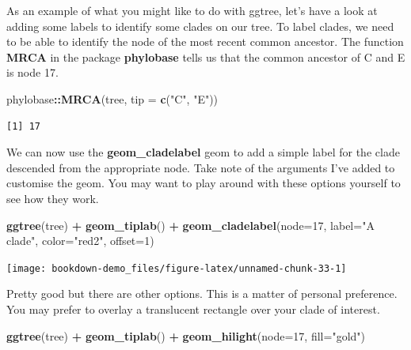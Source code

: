 \documentclass[
]{book}
\newenvironment{Shaded}{\begin{snugshade}}{\end{snugshade}}
\newcommand{\DataTypeTok}[1]{\textcolor[rgb]{0.13,0.29,0.53}{#1}}
\newcommand{\DecValTok}[1]{\textcolor[rgb]{0.00,0.00,0.81}{#1}}
\newcommand{\KeywordTok}[1]{\textcolor[rgb]{0.13,0.29,0.53}{\textbf{#1}}}
\newcommand{\NormalTok}[1]{#1}
\newcommand{\OperatorTok}[1]{\textcolor[rgb]{0.81,0.36,0.00}{\textbf{#1}}}
\newcommand{\StringTok}[1]{\textcolor[rgb]{0.31,0.60,0.02}{#1}}
\begin{document}
As an example of what you might like to do with ggtree, let's have a look at adding some labels to identify some clades on our tree. To label clades, we need to be able to identify the node of the most recent common ancestor. The function \textbf{MRCA} in the package \textbf{phylobase} \citep{phylobase} tells us that the common ancestor of C and E is node 17.

\begin{Shaded}
\begin{Highlighting}[]
\NormalTok{phylobase}\OperatorTok{::}\KeywordTok{MRCA}\NormalTok{(tree, }\DataTypeTok{tip =} \KeywordTok{c}\NormalTok{(}\StringTok{"C"}\NormalTok{, }\StringTok{"E"}\NormalTok{))}
\end{Highlighting}
\end{Shaded}

\begin{verbatim}
[1] 17
\end{verbatim}

We can now use the \textbf{geom\_cladelabel} geom to add a simple label for the clade descended from the appropriate node. Take note of the arguments I've added to customise the geom. You may want to play around with these options yourself to see how they work.

\begin{Shaded}
\begin{Highlighting}[]
\KeywordTok{ggtree}\NormalTok{(tree) }\OperatorTok{+}\StringTok{ }
\StringTok{  }\KeywordTok{geom\_tiplab}\NormalTok{() }\OperatorTok{+}\StringTok{ }
\StringTok{  }\KeywordTok{geom\_cladelabel}\NormalTok{(}\DataTypeTok{node=}\DecValTok{17}\NormalTok{, }\DataTypeTok{label=}\StringTok{"A clade"}\NormalTok{, }
                  \DataTypeTok{color=}\StringTok{"red2"}\NormalTok{, }\DataTypeTok{offset=}\DecValTok{1}\NormalTok{)}
\end{Highlighting}
\end{Shaded}

\begin{center}\texttt{[image: bookdown-demo\_files/figure-latex/unnamed-chunk-33-1]} \end{center}

Pretty good but there are other options. This is a matter of personal preference. You may prefer to overlay a translucent rectangle over your clade of interest.

\begin{Shaded}
\begin{Highlighting}[]
\KeywordTok{ggtree}\NormalTok{(tree) }\OperatorTok{+}\StringTok{ }
\StringTok{  }\KeywordTok{geom\_tiplab}\NormalTok{() }\OperatorTok{+}\StringTok{ }
\StringTok{  }\KeywordTok{geom\_hilight}\NormalTok{(}\DataTypeTok{node=}\DecValTok{17}\NormalTok{, }\DataTypeTok{fill=}\StringTok{"gold"}\NormalTok{)}
\end{Highlighting}
\end{Shaded}
\end{document}
